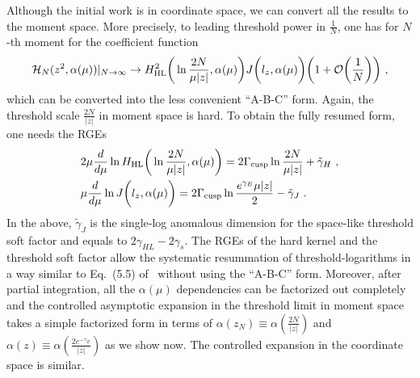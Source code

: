 \documentclass[a4paper,11pt]{article}
\begin{document}
Although the initial work is in coordinate space, we can convert all the results to the moment space.  More precisely, to leading threshold power in $\frac{1}{N}$, one has for $N$-th moment for the  coefficient function
\begin{align}\label{eq:thresholdmomemtfac}
{\cal H}_N(z^2,\alpha(\mu))|_{N\rightarrow \infty} \rightarrow  H^2_{\rm HL} \bigg( \ln \frac{2N}{\mu|z|},\alpha(\mu)\bigg) J\bigg(l_z ,\alpha(\mu )\bigg)\bigg(1+{\cal O}\bigg(\frac{1}{N}\bigg) \bigg)\ ,
\end{align}
which can be converted into the less convenient ``A-B-C'' form.  Again, the threshold scale $\frac{2N}{|z|}$ in moment space is hard.  To obtain the fully resumed form, one needs the RGEs 
\begin{align}
&2\mu \frac{d}{d\mu} \ln H_{\rm HL} \bigg( \ln \frac{2N}{\mu|z|},\alpha(\mu)\bigg) =2\Gamma_{\rm cusp}\ln \frac{2N}{\mu|z|}+\tilde \gamma_H \ , \\ 
&\mu \frac{d}{d\mu} \ln J\bigg(l_z,\alpha(\mu)\bigg)=2\Gamma_{\rm cusp}\ln \frac{e^{\gamma_E}\mu|z|}{2}-\tilde \gamma_J \ .
\end{align}
In the above, $\tilde \gamma_J$ is the single-log anomalous dimension for the space-like threshold soft factor and equals to $2\gamma_{HL}-2\gamma_s$. The RGEs of the hard kernel and the threshold soft factor allow the systematic resummation of threshold-logarithms in a way similar to Eq.~(5.5) of~\cite{Beneke:1995pq} without using the ``A-B-C'' form. Moreover, after partial integration, all the $\alpha(\mu)$ dependencies can be factorized out completely and the controlled asymptotic expansion in the threshold limit in moment space takes a simple factorized form in terms of $\alpha(z_N)\equiv \alpha \left(\frac{2N}{|z|}\right)$ and $\alpha(z) \equiv \alpha\left(\frac{2e^{-\gamma_E}}{|z|}\right)$ as we show now. The controlled expansion in the coordinate space is similar. 
\end{document}

